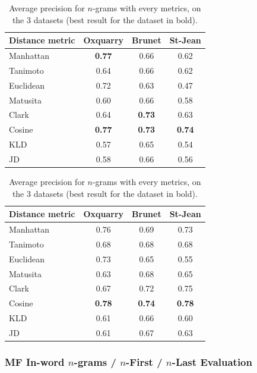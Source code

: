 \begin{table}
  \centering
  \caption{Average precision for $n$-grams with every metrics, on the 3 datasets (best result for the dataset in bold).}
  \label{tab:letter_ngrams}

  \begin{tabular}{l c c c}
    \toprule
    Distance metric & Oxquarry & Brunet & St-Jean \\
    \midrule
    Manhattan & \textbf{0.77} & 0.66 & 0.62 \\
    Tanimoto & 0.64 & 0.66 & 0.62 \\
    Euclidean & 0.72 & 0.63 & 0.47 \\
    Matusita & 0.60 & 0.66 & 0.58 \\
    Clark & 0.64 & \textbf{0.73} & 0.63 \\
    Cosine & \textbf{0.77} & \textbf{0.73} & \textbf{0.74} \\
    KLD & 0.57 & 0.65 & 0.54 \\
    JD & 0.58 & 0.66 & 0.56 \\
    \bottomrule
  \end{tabular}

  \vspace{0.5cm}

  \begin{tabular}{l c c c}
    \toprule
    Distance metric & Oxquarry & Brunet & St-Jean \\
    \midrule
    Manhattan & 0.76 & 0.69 & 0.73 \\
    Tanimoto & 0.68 & 0.68 & 0.68 \\
    Euclidean & 0.73 & 0.65 & 0.55 \\
    Matusita & 0.63 & 0.68 & 0.65 \\
    Clark & 0.67 & 0.72 & 0.75 \\
    Cosine & \textbf{0.78} & \textbf{0.74} & \textbf{0.78} \\
    KLD & 0.61 & 0.66 & 0.60 \\
    JD & 0.61 & 0.67 & 0.63 \\
    \bottomrule
  \end{tabular}
\end{table}

\subsubsection{MF In-word $n$-grams / $n$-First / $n$-Last Evaluation}


